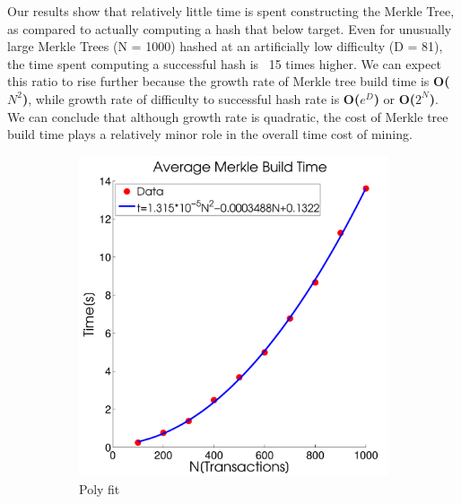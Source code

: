 \documentclass[pdftex,11pt]{article}
\begin{document}
Our results show that relatively little time is spent constructing the Merkle Tree, as compared to actually computing a hash that below target. Even for unusually large Merkle Trees (N = 1000) hashed at an artificially low difficulty (D = 81),  the time spent computing a successful hash is ~15 times higher. We can expect this ratio to rise further because the growth rate of Merkle tree build time is {\bf O($N^2$)}, while growth rate of difficulty to successful hash rate is {\bf O($e^D$)} or {\bf O($2^N$)}. We can conclude that although growth rate is quadratic, the cost of Merkle tree build time plays a relatively minor role in the overall time cost of mining.

\begin{figure}[H]
	\centering
	\begin{subfigure}[H]{0.4\textwidth}
		\includegraphics[width=\textwidth]{figures/MerkPoly.pdf}
		\caption{Poly fit}
	\end{subfigure}
	\begin{subfigure}[H]{0.4\textwidth}

\end{subfigure}
\end{figure}
\end{document}
